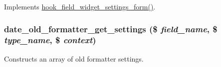 \label{date_8field_8inc_aacfb6134f4d15984d676313004bc7939}
Implements \hyperlink{group__field__types_gabe5ece2134d0cbdfc3c4793f24c5866c}{hook\_\-field\_\-widget\_\-settings\_\-form()}. \hypertarget{date_8field_8inc_a6e4aa76c83e765e2b7e3dfdcd0903479}{
\subsubsection[{date\_\-old\_\-formatter\_\-get\_\-settings}]{\setlength{\rightskip}{0pt plus 5cm}date\_\-old\_\-formatter\_\-get\_\-settings (\$ {\em field\_\-name}, \/  \$ {\em type\_\-name}, \/  \$ {\em context})}}
\label{date_8field_8inc_a6e4aa76c83e765e2b7e3dfdcd0903479}
Constructs an array of old formatter settings. 